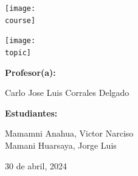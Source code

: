 \documentclass[10pt, a4paper]{article}
\newcommand{\course}{img/web_programming.png}
\newcommand{\topic}{img/docker.png}
\newcommand{\professor}{Carlo Jose Luis Corrales Delgado}
\newcommand{\students}{Mamamni Anahua, Victor Narciso \\ Mamani Huarsaya, Jorge Luis}
\newcommand{\mydate}{30 de abril, 2024}
\begin{document}
\begin{titlepage}
	\centering
	\texttt{[image: \\course]} \par
  \vfill \vfill
	\texttt{[image: \\topic]}\par
  \vfill \vfill
  {\textbf{Profesor(a):} \par}
	\professor \vfill
  {\textbf{Estudiantes:} \par}
	\students \vfill
	{\large \mydate \par}
\end{titlepage}



\end{document}
